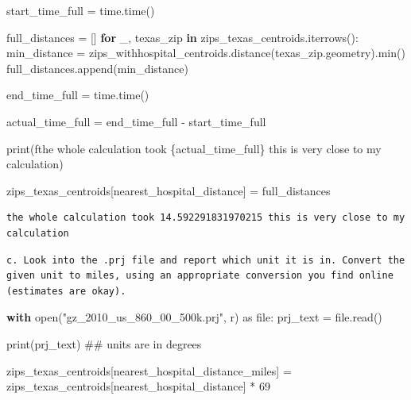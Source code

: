 \documentclass[
  letterpaper,
  DIV=11,
  numbers=noendperiod]{scrartcl}
\newenvironment{Shaded}{\begin{snugshade}}{\end{snugshade}}
\newcommand{\BuiltInTok}[1]{\textcolor[rgb]{0.00,0.23,0.31}{#1}}
\newcommand{\CommentTok}[1]{\textcolor[rgb]{0.37,0.37,0.37}{#1}}
\newcommand{\ControlFlowTok}[1]{\textcolor[rgb]{0.00,0.23,0.31}{\textbf{#1}}}
\newcommand{\DecValTok}[1]{\textcolor[rgb]{0.68,0.00,0.00}{#1}}
\newcommand{\ImportTok}[1]{\textcolor[rgb]{0.00,0.46,0.62}{#1}}
\newcommand{\KeywordTok}[1]{\textcolor[rgb]{0.00,0.23,0.31}{\textbf{#1}}}
\newcommand{\NormalTok}[1]{\textcolor[rgb]{0.00,0.23,0.31}{#1}}
\newcommand{\OperatorTok}[1]{\textcolor[rgb]{0.37,0.37,0.37}{#1}}
\newcommand{\SpecialCharTok}[1]{\textcolor[rgb]{0.37,0.37,0.37}{#1}}
\newcommand{\SpecialStringTok}[1]{\textcolor[rgb]{0.13,0.47,0.30}{#1}}
\newcommand{\StringTok}[1]{\textcolor[rgb]{0.13,0.47,0.30}{#1}}
\begin{document}
\begin{Shaded}
\begin{Highlighting}[]
\NormalTok{start\_time\_full }\OperatorTok{=}\NormalTok{ time.time()}

\NormalTok{full\_distances }\OperatorTok{=}\NormalTok{ []}
\ControlFlowTok{for}\NormalTok{ \_, texas\_zip }\KeywordTok{in}\NormalTok{ zips\_texas\_centroids.iterrows():}
\NormalTok{    min\_distance }\OperatorTok{=}\NormalTok{ zips\_withhospital\_centroids.distance(texas\_zip.geometry).}\BuiltInTok{min}\NormalTok{()}
\NormalTok{    full\_distances.append(min\_distance)}


\NormalTok{end\_time\_full }\OperatorTok{=}\NormalTok{ time.time()}

\NormalTok{actual\_time\_full }\OperatorTok{=}\NormalTok{ end\_time\_full }\OperatorTok{{-}}\NormalTok{ start\_time\_full}

\BuiltInTok{print}\NormalTok{(}\SpecialStringTok{f\textquotesingle{}the whole calculation took }\SpecialCharTok{\{}\NormalTok{actual\_time\_full}\SpecialCharTok{\}}\SpecialStringTok{ this is very close to my calculation\textquotesingle{}}\NormalTok{)}

\NormalTok{zips\_texas\_centroids[}\StringTok{\textquotesingle{}nearest\_hospital\_distance\textquotesingle{}}\NormalTok{] }\OperatorTok{=}\NormalTok{ full\_distances}
\end{Highlighting}
\end{Shaded}

\begin{verbatim}
the whole calculation took 14.592291831970215 this is very close to my calculation
\end{verbatim}

\begin{verbatim}
c. Look into the .prj file and report which unit it is in. Convert the given unit to miles, using an appropriate conversion you find online (estimates are okay).
\end{verbatim}

\begin{Shaded}
\begin{Highlighting}[]
\ControlFlowTok{with} \BuiltInTok{open}\NormalTok{(}\StringTok{"gz\_2010\_us\_860\_00\_500k.prj"}\NormalTok{, }\StringTok{\textquotesingle{}r\textquotesingle{}}\NormalTok{) }\ImportTok{as} \BuiltInTok{file}\NormalTok{:}
\NormalTok{    prj\_text }\OperatorTok{=} \BuiltInTok{file}\NormalTok{.read()}

\BuiltInTok{print}\NormalTok{(prj\_text) }\CommentTok{\#\# units are in degrees}

\NormalTok{zips\_texas\_centroids[}\StringTok{\textquotesingle{}nearest\_hospital\_distance\_miles\textquotesingle{}}\NormalTok{] }\OperatorTok{=}\NormalTok{ zips\_texas\_centroids[}\StringTok{\textquotesingle{}nearest\_hospital\_distance\textquotesingle{}}\NormalTok{] }\OperatorTok{*} \DecValTok{69}
\end{Highlighting}
\end{Shaded}
\end{document}
